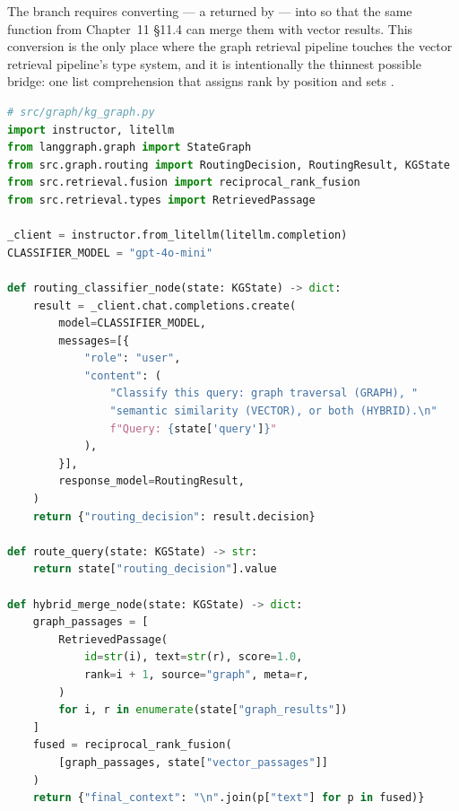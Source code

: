 The  branch requires converting  ---
a  returned by  --- into
 so that the same
 function from Chapter~11 \S11.4 can
merge them with vector results. This conversion is the only place where
the graph retrieval pipeline touches the vector retrieval pipeline's type
system, and it is intentionally the thinnest possible bridge: one list
comprehension that assigns rank by position and sets .

\begin{lstlisting}[language=Python,
  caption={Routing classifier node, route function, and hybrid merge},
  label={lst:routing-nodes}]
# src/graph/kg_graph.py
import instructor, litellm
from langgraph.graph import StateGraph
from src.graph.routing import RoutingDecision, RoutingResult, KGState
from src.retrieval.fusion import reciprocal_rank_fusion
from src.retrieval.types import RetrievedPassage

_client = instructor.from_litellm(litellm.completion)
CLASSIFIER_MODEL = "gpt-4o-mini"

def routing_classifier_node(state: KGState) -> dict:
    result = _client.chat.completions.create(
        model=CLASSIFIER_MODEL,
        messages=[{
            "role": "user",
            "content": (
                "Classify this query: graph traversal (GRAPH), "
                "semantic similarity (VECTOR), or both (HYBRID).\n"
                f"Query: {state['query']}"
            ),
        }],
        response_model=RoutingResult,
    )
    return {"routing_decision": result.decision}

def route_query(state: KGState) -> str:
    return state["routing_decision"].value

def hybrid_merge_node(state: KGState) -> dict:
    graph_passages = [
        RetrievedPassage(
            id=str(i), text=str(r), score=1.0,
            rank=i + 1, source="graph", meta=r,
        )
        for i, r in enumerate(state["graph_results"])
    ]
    fused = reciprocal_rank_fusion(
        [graph_passages, state["vector_passages"]]
    )
    return {"final_context": "\n".join(p["text"] for p in fused)}
\end{lstlisting}

